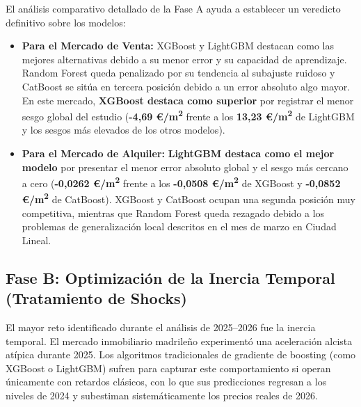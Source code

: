 \documentclass[a4paper,11pt,openany]{book}
\begin{document}
El análisis comparativo detallado de la Fase A ayuda a establecer un veredicto definitivo sobre los modelos:
\begin{itemize}
    \item \textbf{Para el Mercado de Venta:} XGBoost y LightGBM destacan como las mejores alternativas debido a su menor error y su capacidad de aprendizaje. Random Forest queda penalizado por su tendencia al subajuste ruidoso y CatBoost se sitúa en tercera posición debido a un error absoluto algo mayor. En este mercado, \textbf{XGBoost destaca como superior} por registrar el menor sesgo global del estudio (\textbf{-4,69 €/m\textsuperscript{2}} frente a los \textbf{13,23 €/m\textsuperscript{2}} de LightGBM y los sesgos más elevados de los otros modelos).
    \item \textbf{Para el Mercado de Alquiler:} \textbf{LightGBM destaca como el mejor modelo} por presentar el menor error absoluto global y el sesgo más cercano a cero (\textbf{-0,0262 €/m\textsuperscript{2}} frente a los \textbf{-0,0508 €/m\textsuperscript{2}} de XGBoost y \textbf{-0,0852 €/m\textsuperscript{2}} de CatBoost). XGBoost y CatBoost ocupan una segunda posición muy competitiva, mientras que Random Forest queda rezagado debido a los problemas de generalización local descritos en el mes de marzo en Ciudad Lineal.
\end{itemize}



\subsection{Fase B: Optimización de la Inercia Temporal (Tratamiento de Shocks)}
El mayor reto identificado durante el análisis de 2025--2026 fue la inercia temporal. El mercado inmobiliario madrileño experimentó una aceleración alcista atípica durante 2025. Los algoritmos tradicionales de gradiente de boosting (como XGBoost o LightGBM) sufren para capturar este comportamiento si operan únicamente con retardos clásicos, con lo que sus predicciones regresan a los niveles de 2024 y subestiman sistemáticamente los precios reales de 2026.
\end{document}
